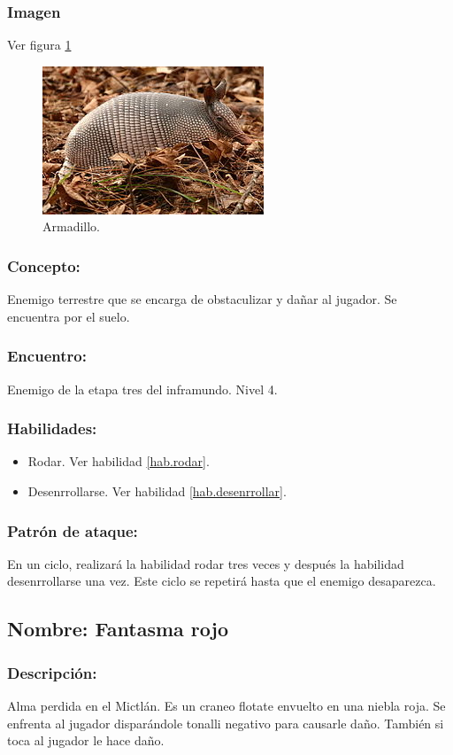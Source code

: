 \documentclass[11pt,letterpaper]{article}
\begin{document}
\subsubsection{Imagen}
Ver figura \ref{fig:armadillo}
\begin{figure}
	\centering
	\includegraphics[height=0.2 \textheight]{Imagenes/armadillo}
	\caption{Armadillo.}
	\label{fig:armadillo}
\end{figure} 
\subsubsection{Concepto:}
Enemigo terrestre que se encarga de obstaculizar y dañar al jugador. Se encuentra por el suelo.
\subsubsection{Encuentro:}
Enemigo de la etapa tres del inframundo.
Nivel 4.
\subsubsection{Habilidades:}
\begin{itemize}
	\item Rodar. Ver habilidad \ref{hab.rodar}.
	\item Desenrrollarse. Ver habilidad \ref{hab.desenrrollar}.
\end{itemize}
\subsubsection{Patrón de ataque:}
En un ciclo, realizará la habilidad rodar tres veces y después la habilidad desenrrollarse una vez. Este ciclo se repetirá hasta que el enemigo desaparezca.

\subsection{Nombre: Fantasma rojo}   \label{per.fantasmaR}
\subsubsection{Descripción:}
Alma perdida en el Mictlán. Es un craneo flotate envuelto en una niebla roja.
Se enfrenta al jugador disparándole tonalli negativo para causarle daño. También si toca al jugador le hace daño. 
\end{document}
